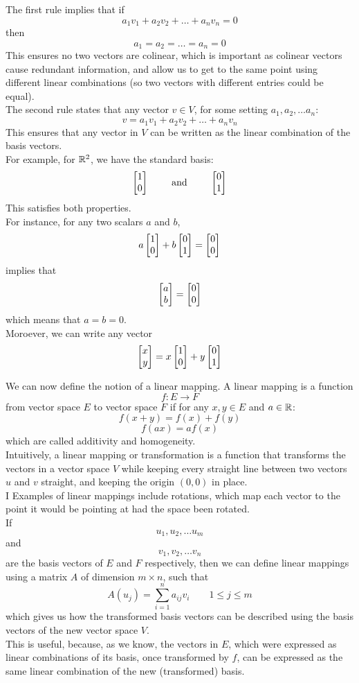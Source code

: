 \documentclass[12pt]{article}
\begin{document}
    The first rule implies that if
    \[ a_1v_1 + a_2v_2 + \dots + a_nv_n = 0 \]
    then 
    \[a_1 = a_2 = \dots = a_n = 0\]
    This ensures no two vectors are colinear,
    which is important as colinear vectors
    cause redundant information,
    and allow us to get to the same point
    using different linear combinations
    (so two vectors with different entries could
    be equal). \\

    The second rule states that any vector $v \in V$,
    for some setting $a_1, a_2, \dots a_n$:
    \[ v = a_1v_1 + a_2v_2 + \dots + a_nv_n \]
    This ensures that any vector in $V$
    can be written as the linear combination
    of the basis vectors. \\

    For example, for $\mathbb{R}^2$,
    we have the standard basis:
    \[ \begin{bmatrix} 1 \\ 0 \end{bmatrix} \qquad
    \text{ and } \qquad \begin{bmatrix} 0 \\ 1 \end{bmatrix} \]
    This satisfies both properties. \\
    For instance, for any two scalars $a$ and $b$,
    \[ a\begin{bmatrix} 1 \\ 0 \end{bmatrix} + b\begin{bmatrix} 0 \\ 1 \end{bmatrix} = \begin{bmatrix} 0 \\ 0 \end{bmatrix} \]
    implies that 
    \[ \begin{bmatrix} a \\ b \end{bmatrix} = \begin{bmatrix} 0 \\ 0 \end{bmatrix}  \]
    which means that $a = b = 0$. \\
    Moroever, we can write any vector
    \[ \begin{bmatrix} x \\ y \end{bmatrix} = x\begin{bmatrix} 1 \\ 0 \end{bmatrix} + y\begin{bmatrix} 0 \\ 1 \end{bmatrix} \]

    We can now define the notion of a linear
    mapping.
    A linear mapping is a function
    \[ f: E \to F \]
    from vector space $E$ to vector space $F$
    if for any $x, y \in E$ and $a \in \mathbb{R}$:
    \[ f(x+y) = f(x) + f(y) \]
    \[ f(ax) = af(x) \]
    which are called additivity and homogeneity. \\
    Intuitively, a linear mapping or transformation
    is a function that transforms the vectors
    in a vector space $V$ while keeping
    every straight line between two vectors $u$ and $v$
    straight, and keeping the origin $(0, 0)$
    in place. \\
    I
    Examples of linear mappings include rotations,
    which map each vector to the point it would 
    be pointing at had the space been rotated. \\

    If
    \[ u_1, u_2, \dots u_m \]
    and
    \[ v_1, v_2, \dots v_n \]
    are the basis vectors of $E$ and $F$
    respectively,
    then we can define linear mappings using 
    a matrix $A$ of dimension $m \times n$,
    such that 
    \[ A (u_j) = \sum_{i=1}^{n} a_{ij}v_i \qquad
    1 \leq j \leq m \]
    which gives us how the transformed basis
    vectors can be described using
    the basis vectors of the new vector space $V$. \\
    This is useful, because, as we know,
    the vectors in $E$,
    which were expressed as linear combinations
    of its basis,
    once transformed by $f$,
    can be expressed as the same linear combination
    of the new (transformed) basis. \\
\end{document}
